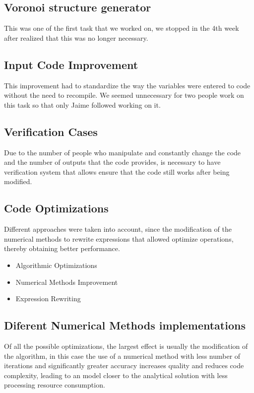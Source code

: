 \documentclass[twoside,letterpaper,12pt]{report}
\begin{document}
	\subsection {Voronoi structure generator}

	This was one of the first task that we worked on, we stopped in the 4th week after realized that this was no longer necessary.	

	\subsection {Input Code Improvement}

	This improvement had to standardize the way the variables were entered to code without the need to recompile. We seemed unnecessary for two people work on this task so that only Jaime followed working on it.


	\subsection {Verification Cases}

	Due to the number of people who manipulate and constantly change the code and the number of outputs that the code provides, is necessary to have verification system that allows ensure that the code still works after being modified.

	\subsection {Code Optimizations}

	Different approaches were taken into account, since the modification of the numerical methods to rewrite expressions that allowed optimize operations, thereby obtaining better performance.

	\begin{itemize}
		\item Algorithmic Optimizations
		\item Numerical Methods Improvement
		\item Expression Rewriting
	\end{itemize}

	
	\subsection {Diferent Numerical Methods implementations}

	Of all the possible optimizations, the largest effect is usually the modification of the algorithm, in this case the use of a numerical method with less number of iterations and significantly greater accuracy increases quality and reduces code complexity, leading to an model closer to the analytical solution with less processing resource consumption.
\end{document}

